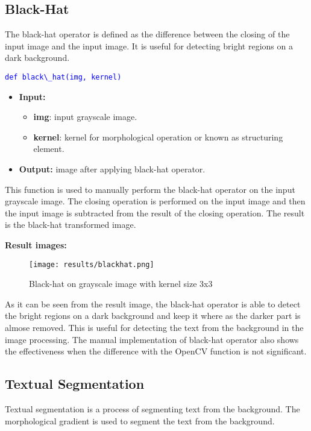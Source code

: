 \documentclass{report}
\begin{document}
\subsection{Black-Hat}
The black-hat operator is defined as the difference between the closing of the input image and the input image. It is useful for detecting bright regions on a dark background.

\textcolor{blue}{\lstinline|def black\_hat(img, kernel)|}
\begin{itemize}
    \item[] \textbf{Input:}
    \begin{itemize}
        \item \textbf{img}: input grayscale image.
        \item \textbf{kernel}: kernel for morphological operation or known as structuring element.
    \end{itemize}
    \item[] \textbf{Output:} image after applying black-hat operator.
\end{itemize}

This function is used to manually perform the black-hat operator on the input grayscale image. The closing operation is performed on the input image and then the input image is subtracted from the result of the closing operation. The result is the black-hat transformed image.

\textbf{Result images:}
\begin{figure}[H]
    \centering
    \texttt{[image: results/blackhat.png]}
    \caption{Black-hat on grayscale image with kernel size 3x3}
\end{figure}

As it can be seen from the result image, the black-hat operator is able to detect the bright regions on a dark background and keep it where as the darker part is almose removed. This is useful for detecting the text from the background in the image processing. The manual implementation of black-hat operator also shows the effectiveness when the difference with the OpenCV function is not significant.

\subsection{Textual Segmentation}
Textual segmentation is a process of segmenting text from the background. The morphological gradient is used to segment the text from the background.
\end{document}
